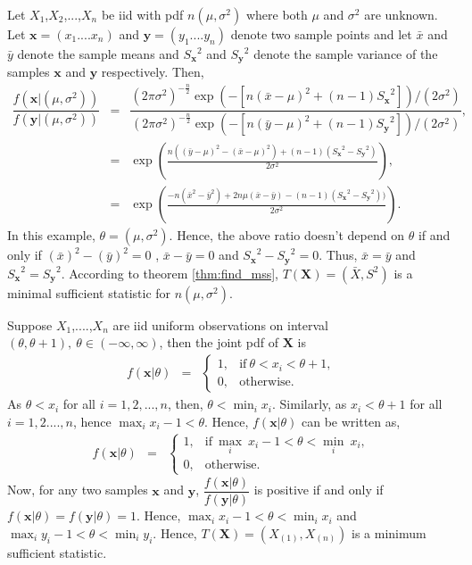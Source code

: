 \documentclass[a4paper,english,12pt]{article}
\newcommand{\bx}{\mathbf{x}}
\newcommand{\by}{\mathbf{y}}
\newcommand{\bX}{\mathbf{X}}
\begin{document}
\begin{exmp}
Let $X_1$,$X_2$,...,$X_n$ be iid with pdf $n(\mu,\sigma^2)$ where both $\mu$ and $\sigma^2$ are unknown. Let $\bx=(x_1....x_n)$ and $\by=(y_1....y_n)$ denote two sample points and let $\bar{x}$ and $\bar{y}$ denote the sample means and ${S_\bx}^2$ and ${S_\by}^2$ denote the sample variance of the samples $\bx$ and $\by$ respectively. Then,
\begin{eqnarray}
\dfrac{f(\bx|(\mu,\sigma^2))}{f(\by|(\mu,\sigma^2))} &=& \dfrac{(2\pi\sigma^2)^{-\tfrac{n}{2}}\exp(-[n(\bar{x}-\mu)^2 + (n-1){S_{\bx}}^2])/(2\sigma^2)}{(2\pi\sigma^2)^{-\tfrac{n}{2}}\exp(-[n(\bar{y}-\mu)^2 + (n-1){S_{\by}}^2])/(2\sigma^2)},\\
&=&\exp\left(\frac{n((\bar{y}-\mu)^2-(\bar{x}-\mu)^2)+(n-1)({S_{\bx}}^2-{S_{\by}}^2)}{2\sigma^2}\right),\\
&=&\exp\left(\frac{-n(\bar{x}^2-\bar{y}^2)+2n\mu(\bar{x}-\bar{y})-(n-1)({S_{\bx}}^2-{S_{\by}}^2))}{2\sigma^2}\right).
\end{eqnarray}
In this example, $\theta = (\mu,\sigma^2)$. Hence, the above ratio doesn't depend on $\theta$ if and only if $(\bar{x})^2 - (\bar{y})^2 = 0$ , $\bar{x} - \bar{y} = 0$ and ${S_{\bx}}^2-{S_{\by}}^2 = 0$. Thus, $\bar{x} = \bar{y}$ and ${S_{\bx}}^2 = {S_{\by}}^2$. According to theorem \ref{thm:find_mss}, $T(\bX) = (\bar{X},S^2)$ is a minimal sufficient statistic for $n(\mu,\sigma^2)$.
\end{exmp}
\begin{exmp}
Suppose $X_1$,....,$X_n$ are iid uniform observations on interval $(\theta,\theta+1), ~\theta\in(-\infty,\infty)$, then the joint pdf of $\bX$ is
\begin{eqnarray}
f(\bx|\theta) &=&
\begin{cases}
1, &\mbox{if}~ \theta<x_i<\theta+1,\\
0, &\mbox{otherwise}.
\end{cases}
\end{eqnarray}
As $\theta<x_i$ for all $i=1,2,...,n$, then, $\theta<\displaystyle\min_i x_i$. Similarly, as $x_i<\theta+1$ for all $i=1,2....,n$, hence $\displaystyle\max_i x_i - 1 < \theta$. Hence, $f(\bx|\theta)$ can be written as,
\begin{eqnarray}
f(\bx|\theta) &=&
\begin{cases}
1, &\mbox{if}~\displaystyle\max_i~ x_i - 1 < \theta < \displaystyle\min_i~x_i,\\
0, &\mbox{otherwise}.
\end{cases}
\end{eqnarray}
Now, for any two samples $\bx$ and $\by$, $\dfrac{f(\bx|\theta)}{f(\by|\theta)}$ is positive if and only if $f(\bx|\theta) = f(\by|\theta) = 1 $. Hence, $\displaystyle\max_i x_i - 1 < \theta < \displaystyle\min_i x_i$ and $\displaystyle\max_i y_i - 1 < \theta < \displaystyle\min_i y_i$.
Hence, $T(\bX)=(X_{(1)},X_{(n)})$ is a minimum sufficient statistic.
\end{exmp}
\end{document}
